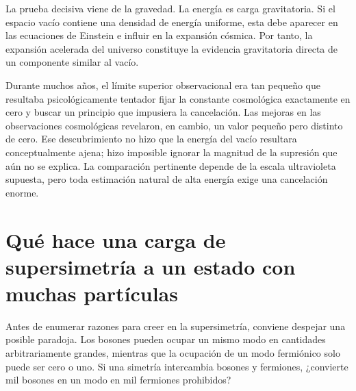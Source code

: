 La prueba decisiva viene de la gravedad. La energía es carga gravitatoria. Si el espacio vacío contiene una densidad de energía uniforme, esta debe aparecer en las ecuaciones de Einstein e influir en la expansión cósmica. Por tanto, la expansión acelerada del universo constituye la evidencia gravitatoria directa de un componente similar al vacío.

\begin{classroomqa}
\end{classroomqa}

Durante muchos años, el límite superior observacional era tan pequeño que resultaba psicológicamente tentador fijar la constante cosmológica exactamente en cero y buscar un principio que impusiera la cancelación. Las mejoras en las observaciones cosmológicas revelaron, en cambio, un valor pequeño pero distinto de cero. Ese descubrimiento no hizo que la energía del vacío resultara conceptualmente ajena; hizo imposible ignorar la magnitud de la supresión que aún no se explica. La comparación pertinente depende de la escala ultravioleta supuesta, pero toda estimación natural de alta energía exige una cancelación enorme.

\section{Qué hace una carga de supersimetría a un estado con muchas partículas}

Antes de enumerar razones para creer en la supersimetría, conviene despejar una posible paradoja. Los bosones pueden ocupar un mismo modo en cantidades arbitrariamente grandes, mientras que la ocupación de un modo fermiónico solo puede ser cero o uno. Si una simetría intercambia bosones y fermiones, ¿convierte mil bosones en un modo en mil fermiones prohibidos?

